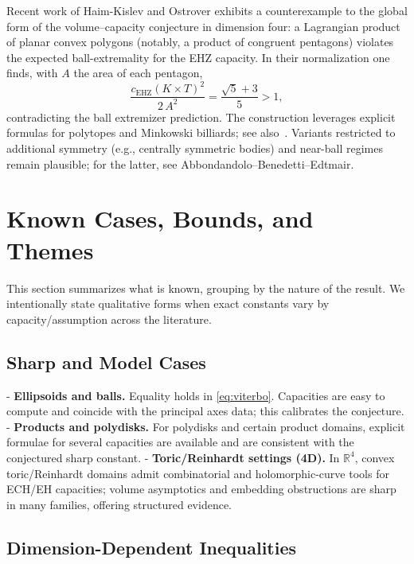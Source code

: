 Recent work of Haim-Kislev and Ostrover\cite{HaimKislevOstrover2024} exhibits a counterexample to the global form of the volume--capacity conjecture in dimension four: a Lagrangian product of planar convex polygons (notably, a product of congruent pentagons) violates the expected ball-extremality for the EHZ capacity. In their normalization one finds, with $A$ the area of each pentagon,
\[ \frac{c_{\mathrm{EHZ}}(K\times T)^2}{2\,A^2} = \frac{\sqrt{5}+3}{5} > 1, \]
contradicting the ball extremizer prediction. The construction leverages explicit formulas for polytopes and Minkowski billiards; see also\ \cite{HaimKislev2019}. Variants restricted to additional symmetry (e.g., centrally symmetric bodies) and near-ball regimes remain plausible; for the latter, see Abbondandolo--Benedetti--Edtmair\cite{AbbondandoloBenedettiEdtmair2023}.

\section{Known Cases, Bounds, and Themes}

This section summarizes what is known, grouping by the nature of the result. We intentionally state
qualitative forms when exact constants vary by capacity/assumption across the literature.

\subsection{Sharp and Model Cases}

- \textbf{Ellipsoids and balls.} Equality holds in \eqref{eq:viterbo}. Capacities are easy to compute
  and coincide with the principal axes data; this calibrates the conjecture.
- \textbf{Products and polydisks.} For polydisks and certain product domains, explicit formulae for
  several capacities are available and are consistent with the conjectured sharp constant.
- \textbf{Toric/Reinhardt settings (4D).} In $\mathbb{R}^4$, convex toric/Reinhardt domains admit
  combinatorial and holomorphic-curve tools for ECH/EH capacities\cite{Hutchings2014,Wormleighton2021};
  volume asymptotics and embedding obstructions are sharp in many families, offering structured evidence.

\subsection{Dimension-Dependent Inequalities}

